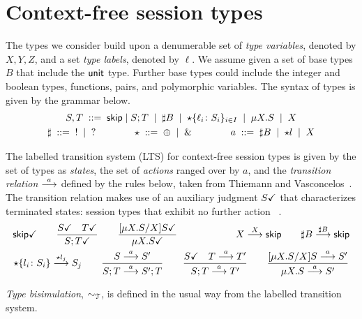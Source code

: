 \section{Context-free session types}
\label{sec:contextfreesession}

The types we consider build upon a denumerable set of \emph{type
  variables}, denoted by $X,Y,Z$, and a set \emph{type labels},
denoted by $\ell$. We assume given a set of base types $B$ that
include the $\unitk$ type. Further base types could include the
integer and boolean types, functions, pairs, and polymorphic
variables. The syntax of types is given by the grammar below.
%
\begin{gather*}
  S,T \grmeq \skipk \mid S;T \grmor \sharp B \grmor 
  \star\{\ell_i\colon S_i\}_{i\in I} \grmor \mu X.S \grmor X
  \\
  \sharp \grmeq {}! \grmor {}? 
  \qquad \qquad
  \star  \grmeq \oplus \grmor {}\&
  \qquad \qquad
  a \grmeq \sharp B \grmor \star l \grmor X
\end{gather*}

%
The labelled transition system (LTS) for context-free session types is
given by the set of types as \emph{states}, the set of \emph{actions}
ranged over by $a$, and the \emph{transition relation} $\LTSderives$
defined by the rules below, taken from Thiemann and
Vasconcelos~\cite{thiemann2016context}.
The transition relation makes
use of an auxiliary judgment $\DONE{S}$ that characterizes terminated
states: session types that exhibit no further
action~\cite{DBLP:journals/jacm/AcetoH92} .
%
  \begin{gather*}
    \DONE{\skipk}
    \qquad
    \frac{\DONE{S} \quad \DONE{T}}{\DONE{S; T}}
    \qquad
    \frac{\DONE{\subs{\mu X.S}{X} S}}{\DONE{\mu X.S}}
    \qquad\qquad\qquad
    X \LTSderives[X] \skipk
    \qquad
    \sharp B \LTSderives[\sharp B] \skipk
    \\
    \star\{l_i\colon S_i\} \LTSderives[\star l_j] S_j
    \qquad
    \frac{S \LTSderives S'}{S; T \LTSderives S';T}
    \qquad
    \frac{\DONE{S} \quad T \LTSderives T'}{S; T \LTSderives T'}
    \qquad
    \frac{\subs{\mu X.S}{X}S \LTSderives S'}{\mu X.S \LTSderives S'}
  \end{gather*}


\emph{Type bisimulation}, $\TypeEquiv$, is defined in the usual way from the
labelled transition system. 

